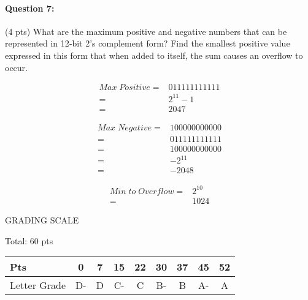 \documentclass[12pt,letterpaper,titlepage]{report}
\begin{document}
\begin{raggedright}
\paragraph{Question 7:}
(4 pts) What are the maximum positive and negative numbers that can be represented in 12‐bit 2’s complement form? Find the smallest positive value expressed in this form that when added to itself, the sum causes an overflow to occur.
\begin{multicols}{3}
\begin{align*}
Max \;Positive = &011111111111 
\\= &2^{11}-1 
\\= &2047
\end{align*}

\begin{align*}
Max \;Negative = &100000000000
\\= &011111111111
\\= &100000000000
\\= &-2^{11}
\\= &-2048
\end{align*}

\begin{align*}
Min\;to\;Overflow =& 2^{10}
\\=&1024
\end{align*}
\end{multicols}

\vspace{\fill}
\noindent
GRADING SCALE
\medskip

Total: 60 pts
\bigskip

\def\arraystretch{1.5} 
\begin{tabular}{ | l | c | c | c | c | c | c | c | c | } \hline
Pts          & 0  & 7  & 15 & 22 & 30 & 37 & 45 & 52     \\\hline
Letter Grade & D- & D  & C- & C  & B- & B  & A- & A      \\\hline
\end{tabular}
\end{raggedright}
\end{document}
